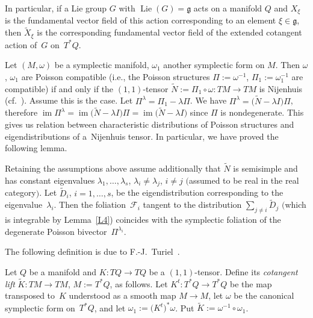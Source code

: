 \begin{Remark}\label{refund}In particular, if a Lie group $G$ with $\operatorname{Lie}(G)=\mathfrak{g}$ acts on a manifold $Q$ and $X_\xi$ is the fundamental vector field of this action corresponding to an element $\xi\in\mathfrak{g}$, then $\widetilde X_\xi$ is the corresponding fundamental vector field of the extended cotangent action of~$G$ on~$T^*Q$.
\end{Remark}

Let $(M,\omega)$ be a symplectic manifold, $\omega_1$ another symplectic form on $M$. Then $\omega$, $\omega_1$ are Poisson compatible (i.e., the Poisson structures $\Pi:=\omega^{-1}$, $\Pi_1:=\omega_1^{-1}$ are compatible) if and only if the $(1,1)$-tensor $\widetilde{N}:=\Pi_1\circ\omega\colon TM\to TM$ is Nijenhuis (cf.\ \cite[Proposition~7.1]{Magri97}). Assume this is the case. Let $\Pi^\lambda= \Pi_1- \lambda \Pi $. We have $\Pi^\lambda =\big(\widetilde{N} - \lambda I \big) \Pi $,
 therefore $ \operatorname{im} \Pi^\lambda = \operatorname{im} \big(\widetilde{N} - \lambda I \big) \Pi = \operatorname{im} \big(\widetilde{N} - \lambda I \big) $ since $\Pi$ is nondegenerate. This gives us relation between characteristic distributions of Poisson structures and eigendistributions of a~Nijenhuis tensor. In particular, we have proved the following lemma.

\begin{Lemma}\label{symplf}Retaining the assumptions above assume additionally that $\widetilde{N}$ is semisimple and has constant eigenvalues $\lambda_1,\dots,\lambda_s$, $\lambda_i\not=\lambda_j$, $i\not=j$ $($assumed to be real in the real category$)$. Let $\widetilde D_i$, $i=1,\dots,s$, be the eigendistribution corresponding to the eigenvalue~$\lambda_i$. Then the foliation~$\mathcal{F}_i$ tangent to the distribution $\sum\limits_{j\not=i}\widetilde D_j$ $($which is integrable by Lemma~{\rm \ref{L4})} coincides with the symplectic foliation of the degenerate Poisson bivector~$\Pi^{\lambda_i}$.
\end{Lemma}

The following definition is due to F.-J.~Turiel~\cite{t12}.

\begin{Definition}\label{ctgl}Let $Q$ be a manifold and $K\colon TQ\to TQ$ be a $(1,1)$-tensor. Define its {\em cotangent lift} $\widetilde{K}\colon TM\to TM$, $M:=T^*Q$, as follows. Let $K^t\colon T^*Q\to T^*Q$ be the map transposed to~$K$ understood as a smooth map $M\to M$, let $\omega$ be the canonical symplectic form on~$T^*Q$, and let $\omega_1:=\big(K^t\big)^*\omega$. Put $\widetilde{K}:=\omega^{-1}\circ\omega_1$.
\end{Definition}

